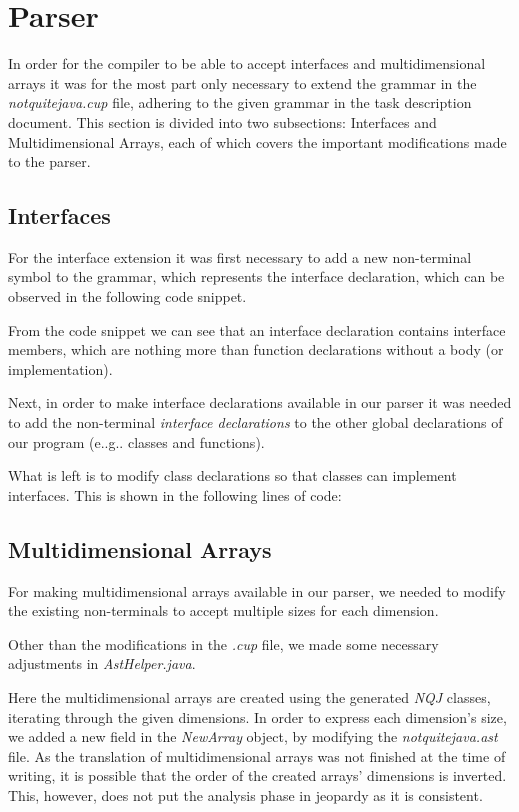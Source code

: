 \section{Parser}
\label{sec:parser}
In order for the compiler to be able to accept interfaces and 
multidimensional arrays it was for the most part only necessary to extend the grammar in the \textit{notquitejava.cup} file,
adhering to the given grammar in the task description document.
This section is divided into two subsections: Interfaces and Multidimensional Arrays,
each of which covers the important modifications made to the parser.

\subsection{Interfaces}
For the interface extension it was first necessary to add a new
non-terminal symbol to the grammar, which represents the interface declaration,
which can be observed in the following code snippet.

From the code snippet we can see that an interface declaration contains interface members, which
are nothing more than function declarations without a body (or implementation).

Next, in order to make interface declarations available in our parser it was needed
to add the non-terminal \textit{interface declarations} to the other global declarations of our program (e.\@.g.\@. classes and functions).


What is left is to modify class declarations so that classes can implement interfaces.
This is shown in the following lines of code:


\subsection{Multidimensional Arrays}
For making multidimensional arrays available in our parser, we needed to modify the
existing non-terminals to accept multiple sizes for each dimension.


Other than the modifications in the \textit{.cup} file, we made some necessary adjustments
in \textit{AstHelper.java}.

Here the multidimensional arrays are created using the generated \textit{NQJ}
classes, iterating through the given dimensions. In order to express each dimension's
size, we added a new field in the \textit{NewArray} object, by modifying the \textit{notquitejava.ast} file.
As the translation of multidimensional arrays was not finished at the time of writing,
it is possible that the order of the created arrays' dimensions is inverted.
This, however, does not put the analysis phase in jeopardy as it is consistent.